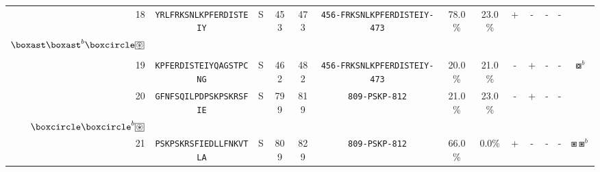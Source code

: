 \begin{tabular}{rcccccccccccc}
18 &  \texttt{YRLFRKSNLKPFERDISTEIY} &       S &    453 &   473 &  \texttt{{\scriptsize 456-}FRKSNLKPFERDISTEIY{\scriptsize -473}} &                          78.0\% &                           23.0\% &          + &           - &          - &           - &  \Centerstack{  $\boxempty \boxempty^b \boxempty^d \boxempty^{bd}$ \\  $\boxast \boxast^b \boxcircle \setlength{\fboxsep}{0.5pt} \boxed{\circledast}$ \\  } \\
19 &  \texttt{KPFERDISTEIYQAGSTPCNG} &       S &    462 &   482 &  \texttt{{\scriptsize 456-}FRKSNLKPFERDISTEIY{\scriptsize -473}} &                          20.0\% &                           21.0\% &          - &           + &          - &           - &                                                                                                                                            $ \boxcircle^b $ \\
20 &  \texttt{GFNFSQILPDPSKPSKRSFIE} &       S &    799 &   819 &                \texttt{{\scriptsize 809-}PSKP{\scriptsize -812}} &                          21.0\% &                           23.0\% &          - &           + &          - &           - &           \Centerstack{  $\boxempty \boxempty^b \boxempty^d \boxempty^{bd}$ \\  $\boxcircle \boxcircle^b \setlength{\fboxsep}{0.5pt} \boxed{\circledast}$ } \\
21 &  \texttt{PSKPSKRSFIEDLLFNKVTLA} &       S &    809 &   829 &                \texttt{{\scriptsize 809-}PSKP{\scriptsize -812}} &                          66.0\% &                            0.0\% &          + &           - &          - &           - &                                                                                                                                       $ \boxast \boxast^b $ \\
\bottomrule
\end{tabular}
